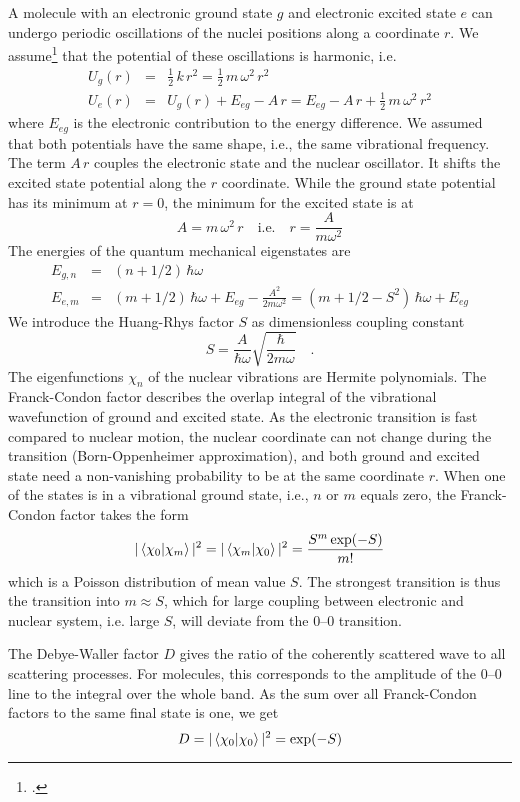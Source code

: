 A molecule with an electronic ground state $g$ and electronic excited state $e$ can undergo periodic oscillations of the nuclei positions along a coordinate $r$. We assume\footcite{Kuzmany} that the potential of these oscillations is harmonic, i.e.
\begin{eqnarray*}
 U_g(r) &=& \frac{1}{2} \, k\, r^2 = \frac{1}{2} \, m \, \omega^2 \, r^2 \\
  U_e(r) &=&  U_g(r) + E_{eg} - A \, r = E_{eg}  - A \, r + \frac{1}{2} \, m \, \omega^2 \, r^2 
 \end{eqnarray*}
where $E_{eg}$ is the electronic contribution to the energy difference. We assumed that both potentials have the same shape, i.e., the same vibrational frequency. The term $A \, r$ couples the electronic state and the nuclear oscillator. It shifts the excited state potential along the $r$ coordinate. While the ground state potential has its minimum at $r=0$, the minimum for the excited state is at
\[
 A = m \, \omega^2 \,  r	 \quad \text{i.e.} \quad r = \frac{A}{m \omega^2}
\]
The energies of the quantum mechanical eigenstates are 
\begin{eqnarray*}
  E_{g, n} &=&  (n + 1/2) \, \hbar \omega  \\
  E_{e, m} &=&  (m + 1/2) \, \hbar \omega  +  E_{eg} - \frac{A^2}{2 m \omega^2} =
   (m + 1/2 - S^2) \, \hbar \omega  +  E_{eg} 
\end{eqnarray*}
We introduce the Huang-Rhys factor $S$ as dimensionless coupling constant
\[
 S = \frac{A}{\hbar \omega} \sqrt{\frac{\hbar}{2 m \omega}} \quad .
\]
The eigenfunctions $\chi_n$ of the nuclear vibrations are Hermite polynomials. The Franck-Condon factor describes the overlap integral of the vibrational wavefunction of ground and excited state. As the electronic transition is fast compared to nuclear motion, the nuclear coordinate can not change during the transition (Born-Oppenheimer approximation), and both ground and excited state need a non-vanishing probability to be at the same coordinate $r$. When one of the states is in a vibrational ground state, i.e., $n$ or $m$ equals zero, the Franck-Condon factor takes the form
\[
 | \braket{ \chi_0 | \chi_m } | ^2  =  | \braket{ \chi_m | \chi_0 } | ^2 = \frac{S^m \exp(-S)}{m!}
\]
which is a Poisson distribution of mean value $S$.  The strongest transition is thus the transition into $m \approx S$, which for large coupling between electronic and nuclear system, i.e. large $S$, will deviate from the 0--0 transition.

The Debye-Waller factor $D$ gives the ratio of the coherently scattered wave to all scattering processes. For molecules, this corresponds to the amplitude of the 0--0 line to the integral over the whole band. As the sum over all Franck-Condon factors to the same final state is one, we get
\[
 D =  | \braket{ \chi_0 | \chi_0 } | ^2 = \exp(-S)
\]


